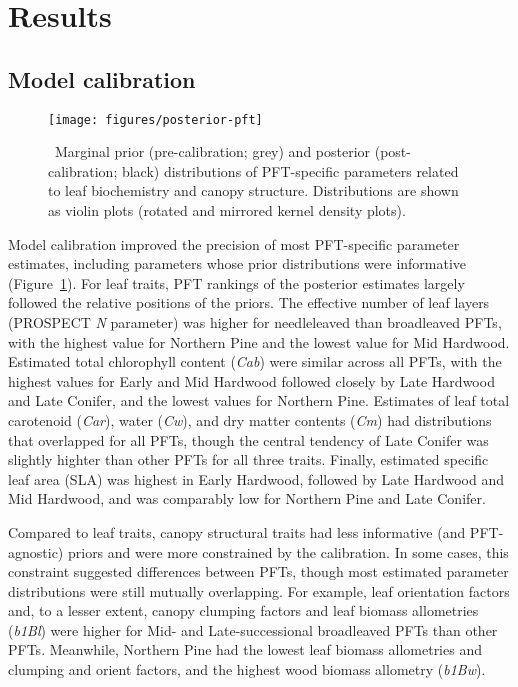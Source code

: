 \section{Results}

\subsection{Model calibration}

\begin{figure}
  \centering
  \texttt{[image: figures/posterior-pft]}
  \caption{\label{fig:posterior-pft}\
    Marginal prior (pre-calibration; grey) and posterior (post-calibration; black) distributions of PFT-specific parameters
    related to leaf biochemistry and canopy structure.
    Distributions are shown as violin plots (rotated and mirrored kernel density plots).
  }
\end{figure}

Model calibration improved the precision of most PFT-specific parameter estimates, including parameters whose prior distributions were informative (Figure~\ref{fig:posterior-pft}).
For leaf traits, PFT rankings of the posterior estimates largely followed the relative positions of the priors.
The effective number of leaf layers (PROSPECT \emph{N} parameter) was higher for needleleaved than broadleaved PFTs, with the highest value for Northern Pine and the lowest value for Mid Hardwood.
Estimated total chlorophyll content (\emph{Cab}) were similar across all PFTs, with the highest values for Early and Mid Hardwood followed closely by Late Hardwood and Late Conifer, and the lowest values for Northern Pine.
Estimates of leaf total carotenoid (\emph{Car}), water (\emph{Cw}), and dry matter contents (\emph{Cm}) had distributions that overlapped for all PFTs, though the central tendency of Late Conifer was slightly highter than other PFTs for all three traits.
Finally, estimated specific leaf area (SLA) was highest in Early Hardwood, followed by Late Hardwood and Mid Hardwood, and was comparably low for Northern Pine and Late Conifer.

Compared to leaf traits, canopy structural traits had less informative (and PFT-agnostic) priors and were more constrained by the calibration.
In some cases, this constraint suggested differences between PFTs, though most estimated parameter distributions were still mutually overlapping.
For example, leaf orientation factors and, to a lesser extent, canopy clumping factors and leaf biomass allometries (\emph{b1Bl}) were higher for Mid- and Late-successional broadleaved PFTs than other PFTs.
Meanwhile, Northern Pine had the lowest leaf biomass allometries and clumping and orient factors, and the highest wood biomass allometry (\emph{b1Bw}).

